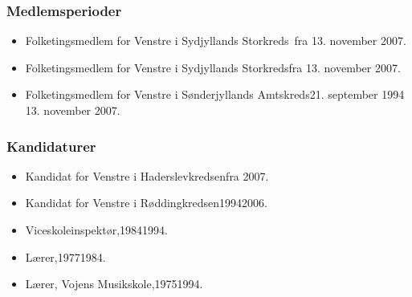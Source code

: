 \documentclass[11pt, a4paper]{awesome-cv}
\begin{document}
\begin{cvletter}
\subsubsection*{Medlemsperioder}
\begin{itemize}
\item Folketingsmedlem for Venstre i Sydjyllands Storkreds fra 13. november 2007.
\item Folketingsmedlem for Venstre i Sydjyllands Storkredsfra 13. november 2007.
\item Folketingsmedlem for Venstre i Sønderjyllands Amtskreds21. september 1994  13. november 2007.
\end{itemize}
\subsubsection*{Kandidaturer}
\begin{itemize}
\item Kandidat for Venstre i Haderslevkredsenfra 2007.
\item Kandidat for Venstre i Røddingkredsen19942006.
\end{itemize}
\begin{itemize}
\item Viceskoleinspektør,19841994.
\item Lærer,19771984.
\item Lærer, Vojens Musikskole,19751994.
\end{itemize}
\end{cvletter}
\end{document}
